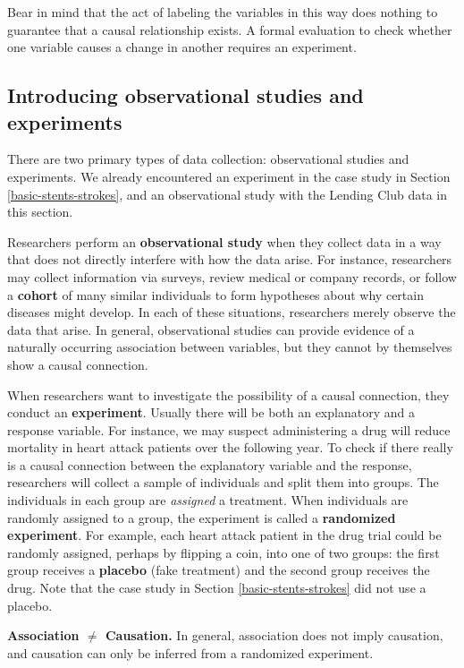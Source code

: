 \documentclass[
  10pt,
  openany]{book}
\theoremstyle{definition}
\theoremstyle{definition}
\theoremstyle{definition}
\theoremstyle{definition}
\theoremstyle{remark}
\begin{document}
Bear in mind that the act of labeling the variables in this way does nothing to guarantee that a causal relationship exists.
A formal evaluation to check whether one variable causes a change in another requires an experiment.

\subsection{Introducing observational studies and experiments}\label{introducing-observational-studies-and-experiments}

There are two primary types of data collection: observational studies and experiments. We already encountered an experiment in the case study in Section \ref{basic-stents-strokes}, and an observational study with the Lending Club data in this section.

Researchers perform an \textbf{observational study} when they collect data in a way that does not directly interfere with how the data arise.
For instance, researchers may collect information via surveys, review medical or company records, or follow a \textbf{cohort} of many similar individuals to form hypotheses about why certain diseases might develop.
In each of these situations, researchers merely observe the data that arise.
In general, observational studies can provide evidence of a naturally occurring association between variables, but they cannot by themselves show a causal connection.

When researchers want to investigate the possibility of a causal connection, they conduct an \textbf{experiment}.
Usually there will be both an explanatory and a response variable.
For instance, we may suspect administering a drug will reduce mortality in heart attack patients over the following year.
To check if there really is a causal connection between the explanatory variable and the response, researchers will collect a sample of individuals and split them into groups.
The individuals in each group are \emph{assigned} a treatment.
When individuals are randomly assigned to a group, the experiment is called a \textbf{randomized experiment}.
For example, each heart attack patient in the drug trial could be randomly assigned, perhaps by flipping a coin, into one of two groups: the first group receives a \textbf{placebo} (fake treatment) and the second group receives the drug.
Note that the case study in Section \ref{basic-stents-strokes} did not use a placebo.

\textbf{Association \(\neq\) Causation.}
In general, association does not imply causation, and causation can only be inferred from a randomized experiment.
\end{document}
